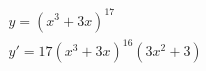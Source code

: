 \begin{ex}
\begin{align}
&y=(x^3+3x)^{17}\nonumber\\
&y'=17(x^3+3x)^{16}(3x^2+3)\nonumber
\end{align}
\end{ex}